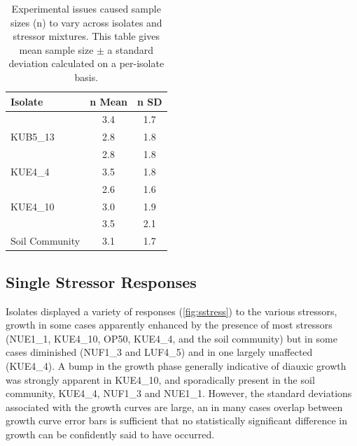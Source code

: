 \documentclass[10pt]{article}
\begin{document}
\begin{table}[ht]
\centering
\small
\caption{Experimental issues caused sample sizes (n) to vary across isolates and stressor mixtures. This table gives mean sample size $\pm$ a standard deviation calculated on a per-isolate basis.}
\begin{tabular}{l c c}
\toprule 
\textbf{Isolate} & \textbf{n Mean} & \textbf{n SD}  \\
\midrule
\rowcolor{gggrey}{LUF4\_5} & 3.4 & 1.7 \\
{KUB5\_13} & 2.8 & 1.8 \\
\rowcolor{gggrey}{NUF1\_3} & 2.8 & 1.8\\
{KUE4\_4} & 3.5 & 1.8\\
\rowcolor{gggrey}{NUE1\_1} & 2.6 & 1.6\\
{KUE4\_10} & 3.0 & 1.9 \\
\rowcolor{gggrey}{OP50} & 3.5 & 2.1 \\
{Soil Community} & 3.1 & 1.7\\
\bottomrule
\end{tabular}
\label{tab:samples}
\end{table}

\newpage
\subsection{Single Stressor Responses}
\label{S:3:3}

Isolates displayed a variety of responses (\cref{fig:sstress}) to the various stressors, growth in some cases apparently enhanced by the presence of most stressors (NUE1\_1, KUE4\_10, OP50, KUE4\_4, and the soil community) but in some cases diminished (NUF1\_3 and LUF4\_5) and in one largely unaffected (KUE4\_4). A bump in  the growth phase generally indicative of diauxic growth was strongly apparent in KUE4\_10, and sporadically present in the soil community, KUE4\_4, NUF1\_3 and NUE1\_1. However, the standard deviations associated with the growth curves are large, an in many cases overlap between growth curve error bars is sufficient that no statistically significant difference in growth can be confidently said to have occurred.
\end{document}

